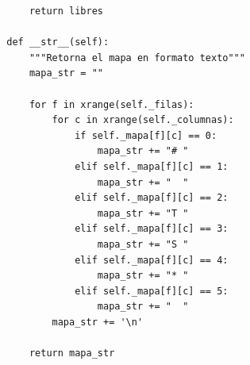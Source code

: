 \documentclass[letter, titlepage, 10pt]{article}
\begin{document}
\begin{lstlisting}
            return libres
    
        def __str__(self):
            """Retorna el mapa en formato texto"""
            mapa_str = ""
    
            for f in xrange(self._filas):
                for c in xrange(self._columnas):
                    if self._mapa[f][c] == 0:
                        mapa_str += "# "
                    elif self._mapa[f][c] == 1:
                        mapa_str += "  "
                    elif self._mapa[f][c] == 2:
                        mapa_str += "T "
                    elif self._mapa[f][c] == 3:
                        mapa_str += "S "
                    elif self._mapa[f][c] == 4:
                        mapa_str += "* "
                    elif self._mapa[f][c] == 5:
                        mapa_str += "  "
                mapa_str += '\n'
    
            return mapa_str
\end{lstlisting}
\end{document}
